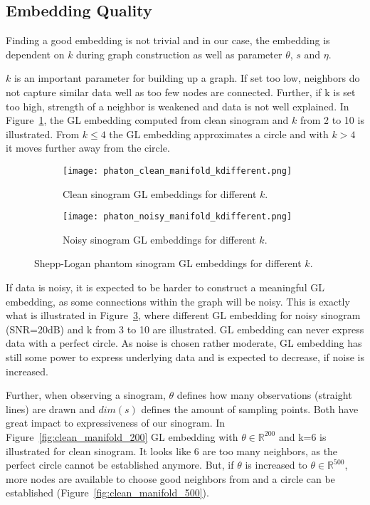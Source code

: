 \subsection{Embedding Quality}
\label{sec:embedding_quality}

Finding a good embedding is not trivial and in our case, the embedding is dependent on $k$ during graph construction
as well as parameter $\theta$, $s$ and $\eta$.

$k$ is an important parameter for building up a graph. If set too low, neighbors
do not capture similar data well as too few nodes are connected. 
Further, if k is set too high, strength of a neighbor 
is weakened and data is not well explained.
In Figure~\ref{fig:clean_manifolds}, the GL embedding computed from clean sinogram and $k$ from 2 to 10 is illustrated.
From $k \leq 4$ the GL embedding approximates a circle and with $k >  4$ it moves further away from the circle. 


\begin{figure}[H]
    \captionsetup[subfigure]{justification=centering}
    \centering
    \begin{subfigure}[t]{0.45\textwidth}
        \texttt{[image: phaton\_clean\_manifold\_kdifferent.png]}
        \caption{Clean sinogram GL embeddings for different $k$.}
        \label{fig:clean_manifolds}
    \end{subfigure}\hfill
    \begin{subfigure}[t]{0.45\textwidth}
      \texttt{[image: phaton\_noisy\_manifold\_kdifferent.png]}
      \caption{Noisy sinogram GL embeddings for different $k$.}
      \label{fig:noisy_manifolds}
    \end{subfigure}\hfill
    \caption{Shepp-Logan phantom sinogram GL embeddings for different $k$.}
  \end{figure}

If data is noisy, it is expected to be harder to construct a meaningful GL embedding, as some connections within
the graph will be noisy. This is exactly what is illustrated in Figure~\ref{fig:noisy_manifolds}, where 
different GL embedding for noisy sinogram (SNR=20dB) and k from 3 to 10 are illustrated.
GL embedding can never express data with a perfect circle. As noise is chosen rather moderate, GL embedding has still some 
power to express underlying data and is expected to decrease, if noise is increased.


Further, when observing a sinogram, $\theta$ defines how many observations (straight lines) are drawn
and $dim(s)$ defines the amount of sampling points. Both have great impact to expressiveness of our sinogram.
In Figure~\ref{fig:clean_manifold_200} GL embedding with $\theta \in \mathbb{R}^{200}$ and k=6 is illustrated
for clean sinogram. It looks like 6 are too many neighbors, as the perfect circle cannot be established anymore.
But, if $\theta$ is increased to $\theta \in \mathbb{R}^{500}$, more nodes are available to choose good neighbors from
and a circle can be established (Figure~\ref{fig:clean_manifold_500}).

